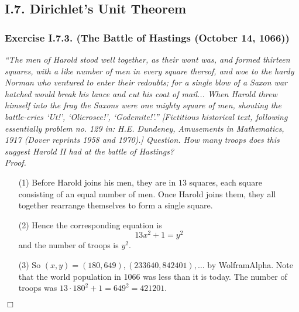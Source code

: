 \documentclass{article}
\begin{document}



\subsection*{I.7. Dirichlet's Unit Theorem \\}






\subsubsection*{Exercise I.7.3. (The Battle of Hastings (October 14, 1066))}
\emph{``The men of Harold stood well together, as their wont was, and formed thirteen squares,
with a like number of men in every square thereof,
and woe to the hardy Norman who ventured to enter their redoubts;
for a single blow of a Saxon war hatched would break his lance and cut his coat of mail...
When Harold threw himself into the fray the Saxons were one mighty square of men,
shouting the battle-cries `Ut!', `Olicrosee!', `Godemite!'.''
[Fictitious historical text, following essentially problem no. 129 in:
H.E. Dundeney, Amusements in Mathematics, 1917 (Dover reprints 1958 and 1970).]
Question. How many troops does this suggest Harold II had at the battle of Hastings?} \\



\emph{Proof.}
\begin{enumerate}
\item[(1)]
  Before Harold joins his men, they are in $13$ squares,
  each square consisting of an equal number of men.
  Once Harold joins them, they all together rearrange themselves to form a single square.

\item[(2)]
  Hence the corresponding equation is
  \[
    13x^2 + 1 = y^2
  \]
  and the number of troops is $y^2$.

\item[(3)]
  So $(x,y) = (180,649), (233640, 842401), \ldots$ by WolframAlpha.
  Note that the world population in 1066 was less than it is today.
  The number of troops was $13 \cdot 180^2 + 1 = 649^2 = 421201$.
\end{enumerate}
$\Box$ \\\\
\end{document}
